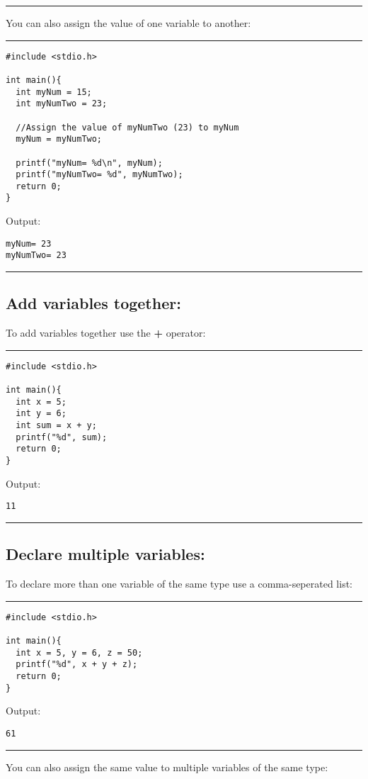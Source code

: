 \documentclass[a4paper]{article}
\begin{document}
\noindent\rule{\textwidth}{0.5pt}

You can also assign the value of one variable to another:

\noindent\rule{\textwidth}{0.5pt}
\begin{verbatim}
#include <stdio.h>

int main(){
  int myNum = 15;
  int myNumTwo = 23;

  //Assign the value of myNumTwo (23) to myNum
  myNum = myNumTwo;

  printf("myNum= %d\n", myNum);
  printf("myNumTwo= %d", myNumTwo);
  return 0;
}
\end{verbatim}
Output:
\begin{verbatim}
myNum= 23
myNumTwo= 23
\end{verbatim}

\noindent\rule{\textwidth}{0.5pt}

\subsection{Add variables together:}
\label{sec:org31bc40c}
To add variables together use the \textbf{+} operator:

\noindent\rule{\textwidth}{0.5pt}
\begin{verbatim}
#include <stdio.h>

int main(){
  int x = 5;
  int y = 6;
  int sum = x + y;
  printf("%d", sum);
  return 0;
}
\end{verbatim}
Output:
\begin{verbatim}
11
\end{verbatim}

\noindent\rule{\textwidth}{0.5pt}

\subsection{Declare multiple variables:}
\label{sec:org5838df7}
To declare more than one variable of the same type use a comma-seperated list:

\noindent\rule{\textwidth}{0.5pt}
\begin{verbatim}
#include <stdio.h>

int main(){
  int x = 5, y = 6, z = 50;
  printf("%d", x + y + z);
  return 0;
}
\end{verbatim}
Output:
\begin{verbatim}
61
\end{verbatim}

\noindent\rule{\textwidth}{0.5pt}
You can also assign the same value to multiple variables of the same type:
\end{document}
